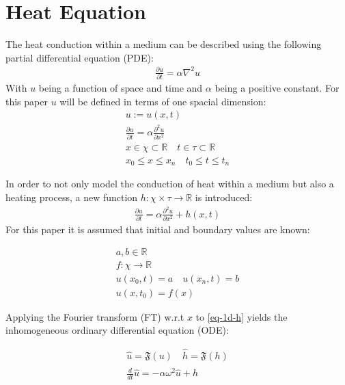 \section{Heat Equation}
The heat conduction within a medium can be described using the following partial differential equation (PDE):
\begin{gather}
\frac{\partial u}{\partial t} = \alpha \nabla^{2} u
\end{gather}
With \(u\) being a function of space and time and \(\alpha\) being a positive constant.
For this paper \(u\) will be defined in terms of one spacial dimension:
\begin{gather}
u := u(x, t) \\
\frac{\partial u}{\partial t} = \alpha \frac{\partial^{2} u}{\partial x^{2}} \\
x \in \chi \subset \mathbb{R} \quad t \in \tau \subset \mathbb{R} \\
x_{0} \leq x \leq x_{n} \quad t_{0} \leq t \leq t_{n} 
\end{gather}
\cite{Gustafsson2011}

In order to not only model the conduction of heat within a medium but also a heating process, a new function \(h: \chi \times \tau \rightarrow  \mathbb{R}\) is introduced:
\begin{gather}
\frac{\partial u}{\partial t} = \alpha \frac{\partial^{2} u}{\partial x^{2}} + h(x,t) \label{eq-1d-h}
\end{gather}
For this paper it is assumed that initial and boundary values are known:

\begin{gather}
a, b \in \mathbb{R} \\
f: \chi \rightarrow \mathbb{R} \\
u(x_{0}, t) = a \quad u(x_{n}, t) = b \\
u(x, t_{0}) = f(x) 
\end{gather} 

Applying the Fourier transform (FT) w.r.t \(x\) to \ref{eq-1d-h} yields the inhomogeneous ordinary differential equation (ODE):

\begin{gather}
\hat{u} = \mathfrak{F}(u) \quad \hat{h} = \mathfrak{F}(h) \\
\frac{d}{dt} \hat{u} = -\alpha\omega^{2}\hat{u} + \hat{h} \label{eq-1d-h-ft}
\end{gather}

